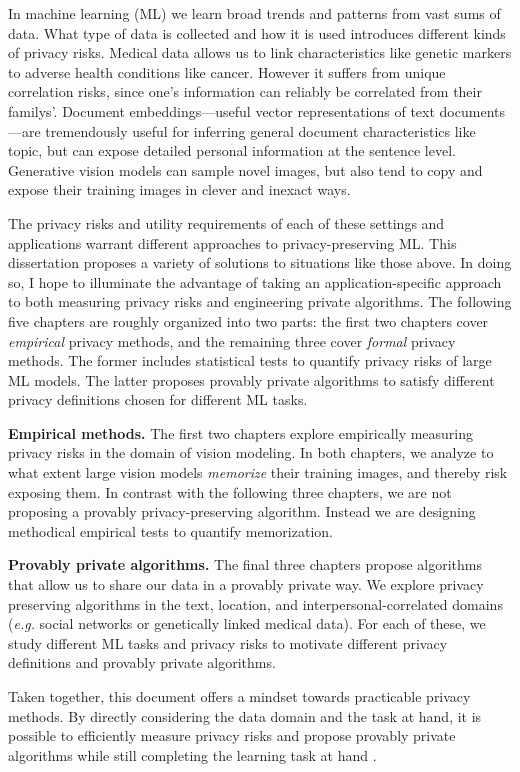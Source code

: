 In machine learning (ML) we learn broad trends and patterns from vast sums of data. What type of data is collected and how it is used introduces different kinds of privacy risks. Medical data allows us to link characteristics like genetic markers to adverse health conditions like cancer. However it suffers from unique correlation risks, since one's information can reliably be correlated from their familys'. Document embeddings---useful vector representations of text documents---are tremendously useful for inferring general document characteristics like topic, but can expose detailed personal information at the sentence level. Generative vision models can sample novel images, but also tend to copy and expose their training images in clever and inexact ways. 

The privacy risks and utility requirements of each of these settings and applications warrant different approaches to privacy-preserving ML. This dissertation proposes a variety of solutions to situations like those above. In doing so, I hope to illuminate the advantage of taking an application-specific approach to both measuring privacy risks and engineering private algorithms. The following five chapters are roughly organized into two parts: the first two chapters cover \emph{empirical} privacy methods, and the remaining three cover \emph{formal} privacy methods. The former includes statistical tests to quantify privacy risks of large ML models. The latter proposes provably private algorithms to satisfy different privacy definitions chosen for different ML tasks. 

\textbf{Empirical methods.} The first two chapters explore empirically measuring privacy risks in the domain of vision modeling. In both chapters, we analyze to what extent large vision models \emph{memorize} their training images, and thereby risk exposing them. In contrast with the following three chapters, we are not proposing a provably privacy-preserving algorithm. Instead we are designing methodical empirical tests to quantify memorization. 

\textbf{Provably private algorithms.} The final three chapters propose algorithms that allow us to share our data in a provably private way. We explore privacy preserving algorithms in the text, location, and interpersonal-correlated domains (\emph{e.g.} social networks or genetically linked medical data). For each of these, we study different ML tasks and privacy risks to motivate different privacy definitions and provably private algorithms. 

Taken together, this document offers a mindset towards practicable privacy methods. By directly considering the data domain and the task at hand, it is possible to efficiently measure privacy risks and propose provably private algorithms while still completing the learning task at hand .